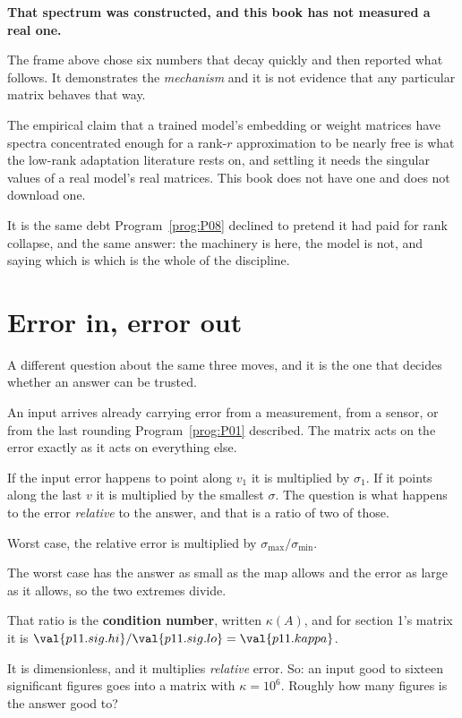 \begin{warning}
\textbf{That spectrum was constructed, and this book has not measured a real
one.}

The frame above chose six numbers that decay quickly and then reported what
follows. It demonstrates the \emph{mechanism} and it is not evidence that any
particular matrix behaves that way.

The empirical claim \dash{} that a trained model's embedding or weight matrices
have spectra concentrated enough for a rank-$r$ approximation to be nearly
free \dash{} is what the low-rank adaptation literature rests on, and settling
it needs the singular values of a real model's real matrices. This book does
not have one and does not download one.

It is the same debt Program~\ref{prog:P08} declined to pretend it had paid for
rank collapse, and the same answer: the machinery is here, the model is not,
and saying which is which is the whole of the discipline.
\end{warning}

\section{Error in, error out}
\label{sec:P11-conditioning}

\begin{fr}
A different question about the same three moves, and it is the one that decides
whether an answer can be trusted.

An input arrives already carrying error \dash{} from a measurement, from a
sensor, or from the last rounding Program~\ref{prog:P01} described.
The matrix acts on the error exactly as it acts on everything else.

If the input error happens to point along $v_1$ it is multiplied by
$\sigma_1$. If it points along the last $v$ it is multiplied by the smallest
$\sigma$. The question is what happens to the error \emph{relative} to the
answer, and that is a ratio of two of those.
\dotline
\nextframe
\end{fr}

\begin{fr}
\begin{ansblock}
Worst case, the relative error is multiplied by
$\sigma_{\max}/\sigma_{\min}$.
\end{ansblock}

The worst case has the answer as small as the map allows and the error as large
as it allows, so the two extremes divide.

That ratio is the \textbf{condition number}, written $\kappa(A)$, and for
section 1's matrix it is
$\val{p11.sig.hi}/\val{p11.sig.lo} = \val{p11.kappa}$.

It is dimensionless, and it multiplies \emph{relative} error. So: an input good
to sixteen significant figures goes into a matrix with $\kappa = 10^{6}$.
Roughly how many figures is the answer good to?
\dotline
\nextframe
\end{fr}

